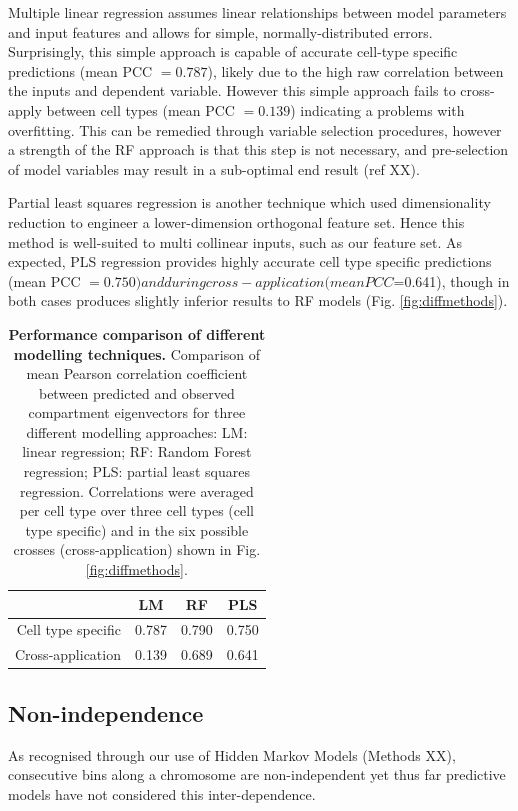 \documentclass[a4paper,11pt,oneside]{book}
\begin{document}
Multiple linear regression assumes linear relationships between model parameters and input features and allows for simple, normally-distributed errors. Surprisingly, this simple approach is capable of accurate cell-type specific predictions (mean PCC $= 0.787$), likely due to the high raw correlation between the inputs and dependent variable. However this simple approach fails to cross-apply between cell types (mean PCC $=0.139$) indicating a problems with overfitting. This can be remedied through variable selection procedures, however a strength of the RF approach is that this step is not necessary, and pre-selection of model variables may result in a sub-optimal end result (ref XX).

Partial least squares regression is another technique which used dimensionality reduction to engineer a lower-dimension orthogonal feature set. Hence this method is well-suited to multi collinear inputs, such as our feature set. As expected, PLS regression provides highly accurate cell type specific predictions (mean PCC $=0.750) and during cross-application (mean PCC $=0.641), though in both cases produces slightly inferior results to RF models (Fig. \ref{fig:diffmethods}).

\begin{table}
\centering
\caption{ {\bf Performance comparison of different modelling techniques. }
 Comparison of mean Pearson correlation coefficient between predicted and observed compartment eigenvectors for three different modelling approaches: LM: linear regression; RF: Random Forest regression; PLS: partial least squares regression. Correlations were averaged per cell type over three cell types (cell type specific) and in the six possible crosses (cross-application) shown in Fig. \ref{fig:diffmethods}.
}
\label{tab:diffmethods}
\begin{tabular}{r|ccc}
& {\bf LM} & {\bf RF} & {\bf PLS} \\
\hline
Cell type specific  &  0.787 & 0.790 & 0.750 \\
Cross-application  & 0.139 & 0.689 & 0.641
\end{tabular}
\end{table}

\subsection{Non-independence}


As recognised through our use of Hidden Markov Models (Methods XX), consecutive bins along a chromosome are non-independent yet thus far predictive models have not considered this inter-dependence. 
\end{document}
